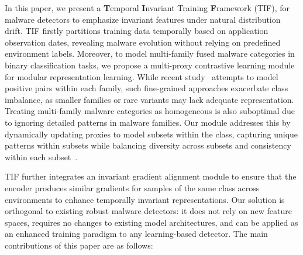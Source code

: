 
In this paper, we present a \textbf{T}emporal \textbf{I}nvariant Training \textbf{F}ramework (TIF), for malware detectors to emphasize invariant features under natural distribution drift. TIF firstly partitions training data temporally based on application observation dates, revealing malware evolution without relying on predefined environment labels. Moreover, to model multi-family fused malware categories in binary classification tasks, we propose a multi-proxy contrastive learning module for modular representation learning. While recent study~\cite{continuous} attempts to model positive pairs within each family, such fine-grained approaches exacerbate class imbalance, as smaller families or rare variants may lack adequate representation. Treating multi-family malware categories as homogeneous is also suboptimal due to ignoring detailed patterns in malware families. Our module addresses this by dynamically updating proxies to model subsets within the class, capturing unique patterns within subsets while balancing diversity across subsets and consistency within each subset~\cite{proxy, mixood}. 

TIF further integrates an invariant gradient alignment module to ensure that the encoder produces similar gradients for samples of the same class across environments to enhance temporally invariant representations. Our solution is orthogonal to existing robust malware detectors: it does not rely on new feature spaces, requires no changes to existing model architectures, and can be applied as an enhanced training paradigm to any learning-based detector. The main contributions of this paper are as follows:


